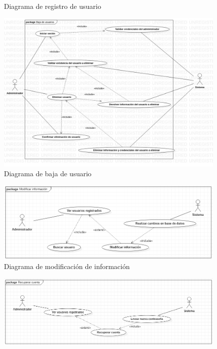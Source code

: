 \documentclass[12pt,letterpaper]{article}
\begin{document}
{\begin{figure}[H]
            \caption{Diagrama de registro de usuario}
        \end{figure}
        \begin{figure}[H]
            \centering
            \includegraphics [scale=0.3]{baja_usuarios}
            \caption{Diagrama de baja de usuario}
        \end{figure}
        \begin{figure}[H]
            \centering
            \includegraphics [scale=0.6]{modificarInformacion}
            \caption{Diagrama de modificación de información}
        \end{figure}
        \begin{figure}[H]
            \centering
            \includegraphics [scale=0.5]{recuperarCuenta}

\end{figure}}
\end{document}
